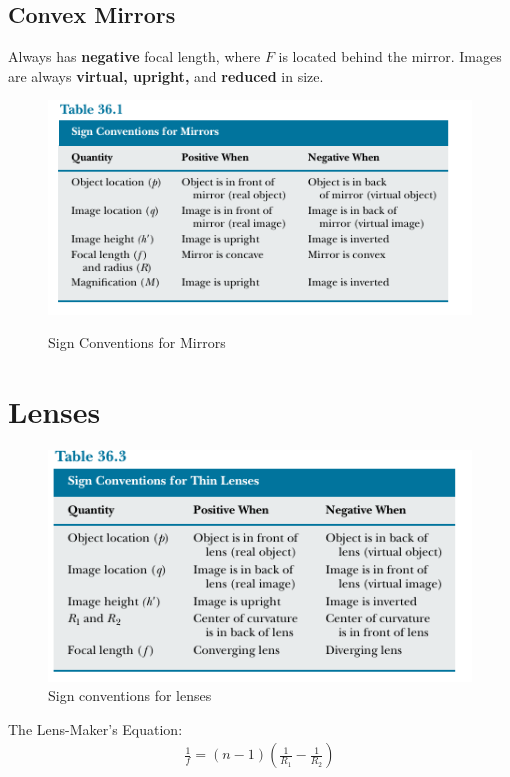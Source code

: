 \documentclass[a4paper,10pt]{report}
\begin{document}
\subsection{Convex Mirrors}
Always has \textbf{negative} focal length, where $F$ is located behind the mirror.
Images are always \textbf{virtual, upright,} and \textbf{reduced} in size.
\begin{figure}[h!]
  \begin{centering}
  \begin{center}
  \includegraphics[width=0.5\linewidth]{./mirrorsignconv.png}
  \label{fig:mirror_sign_conventions}
  \caption{Sign Conventions for Mirrors}
  \end{center}
  \par\end{centering}
  \end{figure}

\section{Lenses}

\begin{figure}[h!]
  \begin{centering}
  \begin{center}
  \includegraphics[width=0.5\linewidth]{./lens_conventions.png}
  \caption{Sign conventions for lenses}
  \label{fig:lens_conventions}
  \end{center}
  \par\end{centering}
  \end{figure}

  The Lens-Maker's Equation:
  \begin{align*}
    \frac{1}{f} = (n-1)\left(\frac{1}{R_1} - \frac{1}{R_2}\right)
  \end{align*}
\end{document}

